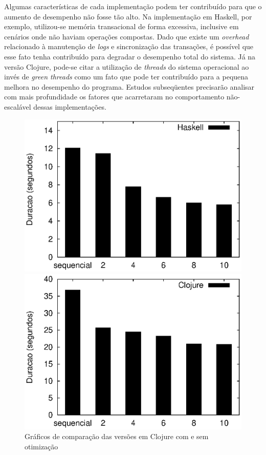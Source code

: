 Algumas características de cada implementação podem ter contribuído para que o aumento de desempenho não fosse tão alto. Na implementação em Haskell, por exemplo, utilizou-se memória transacional de forma excessiva, inclusive em cenários onde não haviam operações compostas. Dado que existe um \emph{overhead} relacionado à manutenção de \emph{logs} e sincronização das transações, é possível que esse fato tenha contribuído para degradar o desempenho total do sistema. Já na versão Clojure, pode-se citar a utilização de \emph{threads} do sistema operacional ao invés de \emph{green threads} como um fato que pode ter contribuído para a pequena melhora no desempenho do programa. Estudos subseqüentes precisarão analisar com mais profundidade os fatores que acarretaram no comportamento não-escalável dessas implementações.

\begin{figure}[h]
 \begin{minipage}{0.5\textwidth}
  \centering
  \includegraphics[scale=0.63]{imagens/haskell.eps} %
 \end{minipage}
 \begin{minipage}{0.5\textwidth}
  \includegraphics[scale=0.63]{imagens/clojure.eps} %
 \end{minipage}
 \caption{Gráficos de comparação das versões em Clojure com e sem otimização}
 \label{fig:clj-opt}
\end{figure}


